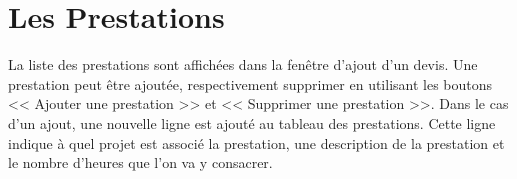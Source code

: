 \section{Les Prestations}
La liste des prestations sont affichées dans la fenêtre d'ajout d'un devis. Une prestation peut être ajoutée, respectivement supprimer en utilisant les boutons << Ajouter une prestation >> et << Supprimer une prestation >>. Dans le cas d'un ajout, une nouvelle ligne est ajouté au tableau des prestations. Cette ligne indique à quel projet est associé la prestation, une description de la prestation et le nombre d'heures que l'on va y consacrer. 
